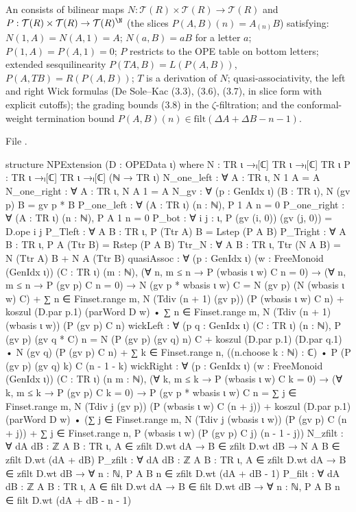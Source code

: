 \begin{definition}\label{l11:def:npext}
An  consists of bilinear maps $N:\mathcal T(R)\times\mathcal T(R)\to\mathcal T(R)$ and
$P:\mathcal T(R)\times\mathcal T(R)\to\mathcal T(R)^{\N}$ (the slices $P(A,B)(n) = A_{(n)}B$) satisfying: $N(1,A) = N(A,1) = A$;
$N(a,B) = aB$ for a letter $a$; $P(1,A) = P(A,1) = 0$; $P$ restricts to the OPE table on bottom letters; extended
sesquilinearity $P(TA,B) = L(P(A,B))$, $P(A,TB) = R(P(A,B))$; $T$ is a derivation of $N$; quasi-associativity, the left and
right Wick formulas (De Sole--Kac (3.3), (3.6), (3.7), in slice form with explicit cutoffs); the grading bounds (3.8) in the
$\zeta$-filtration; and the conformal-weight termination bound $P(A,B)(n)\in\mathrm{filt}(\Delta A+\Delta B-n-1)$.
\end{definition}
\noindent File .
\begin{leancode}
structure NPExtension (D : OPEData ι) where
  N : TR ι →ₗ[ℂ] TR ι →ₗ[ℂ] TR ι
  P : TR ι →ₗ[ℂ] TR ι →ₗ[ℂ] (ℕ → TR ι)
  N_one_left : ∀ A : TR ι, N 1 A = A
  N_one_right : ∀ A : TR ι, N A 1 = A
  N_gv : ∀ (p : GenIdx ι) (B : TR ι), N (gv p) B = gv p * B
  P_one_left : ∀ (A : TR ι) (n : ℕ), P 1 A n = 0
  P_one_right : ∀ (A : TR ι) (n : ℕ), P A 1 n = 0
  P_bot : ∀ i j : ι, P (gv (i, 0)) (gv (j, 0)) = D.ope i j
  P_Tleft : ∀ A B : TR ι, P (Ttr A) B = Lstep (P A B)
  P_Tright : ∀ A B : TR ι, P A (Ttr B) = Rstep (P A B)
  Ttr_N : ∀ A B : TR ι, Ttr (N A B) = N (Ttr A) B + N A (Ttr B)
  quasiAssoc : ∀ (p : GenIdx ι) (w : FreeMonoid (GenIdx ι)) (C : TR ι) (m : ℕ),
    (∀ n, m ≤ n → P (wbasis ι w) C n = 0) →
    (∀ n, m ≤ n → P (gv p) C n = 0) →
    N (gv p * wbasis ι w) C
      = N (gv p) (N (wbasis ι w) C)
        + ∑ n ∈ Finset.range m, N (Tdiv (n + 1) (gv p)) (P (wbasis ι w) C n)
        + koszul (D.par p.1) (parWord D w) •
            ∑ n ∈ Finset.range m, N (Tdiv (n + 1) (wbasis ι w)) (P (gv p) C n)
  wickLeft : ∀ (p q : GenIdx ι) (C : TR ι) (n : ℕ),
    P (gv p) (gv q * C) n
      = N (P (gv p) (gv q) n) C
        + koszul (D.par p.1) (D.par q.1) • N (gv q) (P (gv p) C n)
        + ∑ k ∈ Finset.range n,
            ((n.choose k : ℕ) : ℂ) • P (P (gv p) (gv q) k) C (n - 1 - k)
  wickRight : ∀ (p : GenIdx ι) (w : FreeMonoid (GenIdx ι)) (C : TR ι) (n m : ℕ),
    (∀ k, m ≤ k → P (wbasis ι w) C k = 0) →
    (∀ k, m ≤ k → P (gv p) C k = 0) →
    P (gv p * wbasis ι w) C n
      = ∑ j ∈ Finset.range m, N (Tdiv j (gv p)) (P (wbasis ι w) C (n + j))
        + koszul (D.par p.1) (parWord D w) •
            (∑ j ∈ Finset.range m, N (Tdiv j (wbasis ι w)) (P (gv p) C (n + j))
              + ∑ j ∈ Finset.range n, P (wbasis ι w) (P (gv p) C j) (n - 1 - j))
  N_zfilt : ∀ {dA dB : ℤ} {A B : TR ι}, A ∈ zfilt D.wt dA → B ∈ zfilt D.wt dB →
    N A B ∈ zfilt D.wt (dA + dB)
  P_zfilt : ∀ {dA dB : ℤ} {A B : TR ι}, A ∈ zfilt D.wt dA → B ∈ zfilt D.wt dB →
    ∀ n : ℕ, P A B n ∈ zfilt D.wt (dA + dB - 1)
  P_filt : ∀ {dA dB : ℤ} {A B : TR ι}, A ∈ filt D.wt dA → B ∈ filt D.wt dB →
    ∀ n : ℕ, P A B n ∈ filt D.wt (dA + dB - n - 1)
\end{leancode}

